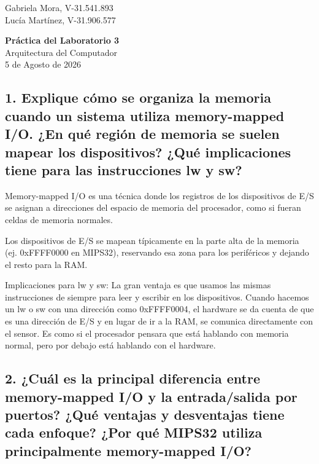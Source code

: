 \documentclass[12pt]{article}
\begin{document}
\begin{flushright}
Gabriela Mora, V-31.541.893 \\
Lucía Martínez, V-31.906.577 \\
\end{flushright}

\vspace{1cm}

\begin{center}
\LARGE\textbf{Práctica del Laboratorio 3} \\
\vspace{0.3cm}
\large Arquitectura del Computador \\
\vspace{0.3cm}
\normalsize 5 de Agosto de 2026
\end{center}

\vspace{1cm}

\subsection*{1. Explique cómo se organiza la memoria cuando un sistema utiliza memory-mapped I/O. ¿En qué región de memoria se suelen mapear los dispositivos? ¿Qué implicaciones tiene para las instrucciones lw y sw?}

Memory-mapped I/O es una técnica donde los registros de los dispositivos de E/S se asignan a direcciones del espacio de memoria del procesador, como si fueran celdas de memoria normales.

Los dispositivos de E/S se mapean típicamente en la parte alta de la memoria (ej. 0xFFFF0000 en MIPS32), reservando esa zona para los periféricos y dejando el resto para la RAM.

Implicaciones para lw y sw: La gran ventaja es que usamos las mismas instrucciones de siempre para leer y escribir en los dispositivos. Cuando hacemos un lw o sw con una dirección como 0xFFFF0004, el hardware se da cuenta de que es una dirección de E/S y en lugar de ir a la RAM, se comunica directamente con el sensor. Es como si el procesador pensara que está hablando con memoria normal, pero por debajo está hablando con el hardware.

\subsection*{2. ¿Cuál es la principal diferencia entre memory-mapped I/O y la entrada/salida por puertos? ¿Qué ventajas y desventajas tiene cada enfoque? ¿Por qué MIPS32 utiliza principalmente memory-mapped I/O?}
\end{document}
